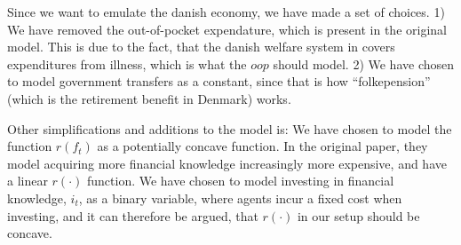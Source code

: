 Since we want to emulate the danish economy, we have made a set of choices. 1) We have removed the out-of-pocket expendature, which is present in the original model. This is due to the fact, that the danish welfare system in covers expenditures from illness, which is what the $oop$ should model. 2) We have chosen to model government transfers as a constant, since that is how ``folkepension'' (which is the retirement benefit in Denmark) works.

Other simplifications and additions to the model is: We have chosen to model the function $r(f_t)$ as a potentially concave function. In the original paper, they model acquiring more financial knowledge increasingly more expensive, and have a linear $r(\cdot)$ function. We have chosen to model investing in financial knowledge, $i_t$, as a binary variable, where agents incur a fixed cost when investing, and it can therefore be argued, that $r(\cdot)$ in our setup should be concave.


